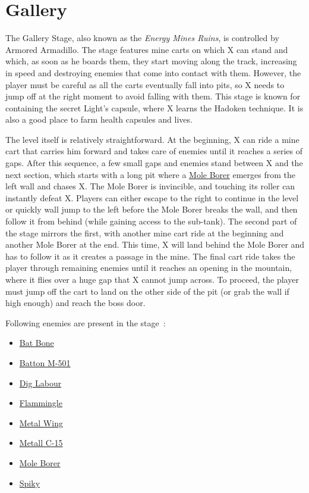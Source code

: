 \section{Gallery}
The Gallery Stage, also known as the \textit{Energy Mines Ruins}, is controlled by Armored Armadillo. The stage features mine carts on which X can stand and which, as soon as he boards them, they start moving along the track, increasing in speed and destroying enemies that come into contact with them. However, the player must be careful as all the carts eventually fall into pits, so X needs to jump off at the right moment to avoid falling with them. This stage is known for containing the secret Light's capsule, where X learns the Hadoken technique. It is also a good place to farm health capsules and lives.

The level itself is relatively straightforward. At the beginning, X can ride a mine cart that carries him forward and takes care of enemies until it reaches a series of gaps. After this sequence, a few small gaps and enemies stand between X and the next section, which starts with a long pit where a \hyperlink{miniboss:Mole_Borer}{Mole Borer} emerges from the left wall and chases X. The Mole Borer is invincible, and touching its roller can instantly defeat X. Players can either escape to the right to continue in the level or quickly wall jump to the left before the Mole Borer breaks the wall, and then follow it from behind (while gaining access to the sub-tank). The second part of the stage mirrors the first, with another mine cart ride at the beginning and another Mole Borer at the end. This time, X will land behind the Mole Borer and has to follow it as it creates a passage in the mine. The final cart ride takes the player through remaining enemies until it reaches an opening in the mountain, where it flies over a huge gap that X cannot jump across. To proceed, the player must jump off the cart to land on the other side of the pit (or grab the wall if high enough) and reach the boss door.

Following enemies are present in the stage~\cite{wiki:Gallery}:
\begin{itemize}
	\item \hyperlink{enem:Batton_Bone}{Bat Bone} 
	\item \hyperlink{enem:Batton_M-501}{Batton M-501} 
	\item \hyperlink{enem:Dig_Labour}{Dig Labour} 
	\item \hyperlink{enem:Flammingle}{Flammingle} 
	\item \hyperlink{enem:Metal_Wing}{Metal Wing} 
	\item \hyperlink{enem:Metall_C-15}{Metall C-15} 
	\item \hyperlink{miniboss:Mole_Borer}{Mole Borer}
	\item \hyperlink{enem:Spiky}{Spiky}
\end{itemize}


